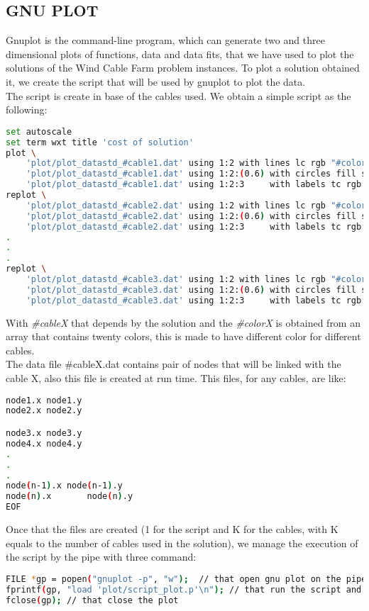 \begin{appendices}
\chapter{GNU PLOT}
Gnuplot is the command-line program, which can generate two and three dimensional plots of functions, data and data fits, that we have used to plot the solutions of the Wind Cable Farm problem instances.
To plot a solution obtained it, we create the script that will be used by gnuplot to plot the data.\\
The script is create in base of the cables used. We obtain a simple script as the following:
\begin{lstlisting}[language=bash,caption={Gnuplot script}]
set autoscale
set term wxt title 'cost of solution'
plot \
	'plot/plot_datastd_#cable1.dat' using 1:2 with lines lc rgb "#color1" lw 2 title "Cable 1",\
	'plot/plot_datastd_#cable1.dat' using 1:2:(0.6) with circles fill solid lc rgb "black" notitle,\
	'plot/plot_datastd_#cable1.dat' using 1:2:3     with labels tc rgb "black" offset (0,0) font 'Arial Bold' notitle
replot \
	'plot/plot_datastd_#cable2.dat' using 1:2 with lines lc rgb "#color2" lw 2 title "Cable 2",\
	'plot/plot_datastd_#cable2.dat' using 1:2:(0.6) with circles fill solid lc rgb "black" notitle,\
	'plot/plot_datastd_#cable2.dat' using 1:2:3     with labels tc rgb "black" offset (0,0) font 'Arial Bold' notitle
.
.
.
replot \
	'plot/plot_datastd_#cable3.dat' using 1:2 with lines lc rgb "#color3" lw 2 title "Cable 3",\
	'plot/plot_datastd_#cable3.dat' using 1:2:(0.6) with circles fill solid lc rgb "black" notitle,\
	'plot/plot_datastd_#cable3.dat' using 1:2:3     with labels tc rgb "black" offset (0,0) font 'Arial Bold' notitle

\end{lstlisting}
With \textit{\#cableX} that depends by the solution and the \textit{\#colorX } is obtained from an array that contains twenty colors, this is made to have different color for different cables.\\
The data file \#cableX.dat contains pair of nodes that will be linked with the cable X, also this file is created at run time. This files, for any cables, are like:
\newpage
\begin{lstlisting}[language=bash,caption={Data file containing cables}]
node1.x	node1.y
node2.x	node2.y

node3.x	node3.y
node4.x	node4.y
.
.
.
node(n-1).x	node(n-1).y
node(n).x		node(n).y
EOF
\end{lstlisting}
Once that the files are created (1 for the script and K for the cables, with K equals to the number of cables used in the solution), we manage the execution of the script by the pipe with three command:
\begin{lstlisting}[language=bash,caption={Script execution}]
FILE *gp = popen("gnuplot -p", "w");  // that open gnu plot on the pipe 
fprintf(gp, "load 'plot/script_plot.p'\n"); // that run the script and show the plot
fclose(gp); // that close the plot
\end{lstlisting}




\end{appendices}
